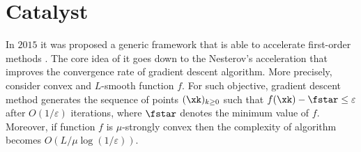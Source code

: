 \section{Catalyst}
\label{sec:catalyst}
In $2015$ it was proposed a generic framework that is able to accelerate first-order methods \cite{lin2015universal}. The core idea of it goes down to the Nesterov's acceleration \cite{nesterov-book} that improves the convergence rate of gradient descent algorithm.
More precisely, consider convex and $L$-smooth function $f$. For such objective, gradient descent method generates the sequence of points $(\xk)_{k\geq0}$ such that $f(\xk) - \fstar\leq \varepsilon$ after $O(1/\varepsilon)$ iterations, where $\fstar$ denotes the minimum value of $f$. Moreover, if function $f$ is $\mu$-strongly convex then the complexity of algorithm becomes $O(L/\mu\log(1/\varepsilon))$.